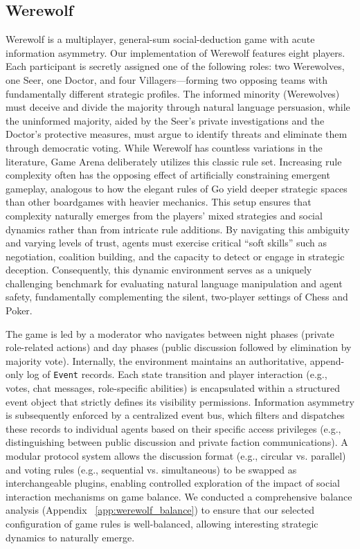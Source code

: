 \documentclass{article}
\begin{document}
\subsection{Werewolf}
\label{sec:werewolf_methods}

Werewolf is a multiplayer, general-sum social-deduction game with acute information asymmetry. Our implementation of Werewolf features eight players. Each participant is secretly assigned one of the following roles: two Werewolves, one Seer, one Doctor, and four Villagers—forming two opposing teams with fundamentally different strategic profiles. The informed minority (Werewolves) must deceive and divide the majority through natural language persuasion, while the uninformed majority, aided by the Seer's private investigations and the Doctor's protective measures, must argue to identify threats and eliminate them through democratic voting. While Werewolf has countless variations in the literature, Game Arena deliberately utilizes this classic rule set. Increasing rule complexity often has the opposing effect of artificially constraining emergent gameplay, analogous to how the elegant rules of Go yield deeper strategic spaces than other boardgames with heavier mechanics. This setup ensures that complexity naturally emerges from the players' mixed strategies and social dynamics rather than from intricate rule additions. By navigating this ambiguity and varying levels of trust, agents must exercise critical ``soft skills'' such as negotiation, coalition building, and the capacity to detect or engage in strategic deception. Consequently, this dynamic environment serves as a uniquely challenging benchmark for evaluating natural language manipulation and agent safety, fundamentally complementing the silent, two-player settings of Chess and Poker.

The game is led by a moderator who navigates between night phases (private role-related actions) and day phases (public discussion followed by elimination by majority vote). Internally, the environment maintains an authoritative, append-only log of \texttt{Event} records. Each state transition and player interaction (e.g., votes, chat messages, role-specific abilities) is encapsulated within a structured event object that strictly defines its visibility permissions. Information asymmetry is subsequently enforced by a centralized event bus, which filters and dispatches these records to individual agents based on their specific access privileges (e.g., distinguishing between public discussion and private faction communications). A modular protocol system allows the discussion format (e.g., circular vs. parallel) and voting rules (e.g., sequential vs. simultaneous) to be swapped as interchangeable plugins, enabling controlled exploration of the impact of social interaction mechanisms on game balance. We conducted a comprehensive balance analysis (Appendix ~\ref{app:werewolf_balance}) to ensure that our selected configuration of game rules is well-balanced, allowing interesting strategic dynamics to naturally emerge.
\end{document}
